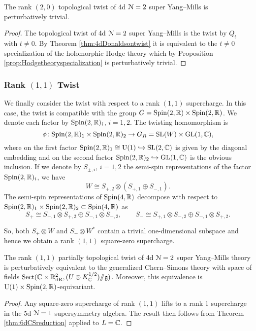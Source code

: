 \documentclass[10pt, oneside]{article}
\begin{document}
\begin{corollary}
The rank $(2,0)$ topological twist of 4d $\mathcal N=2$ super Yang--Mills is perturbatively trivial.
\label{cor:4dDonaldsontwist}
\end{corollary}
\begin{proof}
The topological twist of 4d $\mathcal N=2$ super Yang--Mills is the twist by $Q_t$ with $t\neq 0$. By Theorem \ref{thm:4dDonaldsontwist} it is equivalent to the $t\neq 0$ specialization of the holomorphic Hodge theory which by Proposition \ref{prop:Hodgetheoryspecialization} is perturbatively trivial.
\end{proof}

\subsubsection{Rank \texorpdfstring{$(1,1)$}{(1,1)} Twist}
\label{sect:4d_2_11}

We finally consider the twist with respect to a rank $(1,1)$ supercharge.
In this case, the twist is compatible with the group $G = \mathrm{Spin}(2, \mathbb R) \times \mathrm{Spin}(2, \mathbb R)$. 
We denote each factor by $\mathrm{Spin}(2, \mathbb R)_i$, $i=1,2$.  
The twisting homomorphism is
\[
\phi \colon \mathrm{Spin}(2, \mathbb R)_1 \times \mathrm{Spin}(2, \mathbb R)_2 \to G_R=\mathrm{SL}(W)\times \mathrm{GL}(1, \mathbb C),
\]
where on the first factor $\mathrm{Spin}(2, \mathbb R)_1 \cong \mathrm{U}(1)\hookrightarrow \mathrm{SL}(2, \mathbb C)$ is given by the diagonal embedding and on the second factor $\mathrm{Spin}(2, \mathbb R)_2 \hookrightarrow \mathrm{GL}(1, \mathbb C)$ is the obvious inclusion. 
If we denote by $S_{\pm, i}$, $i=1,2$ the semi-spin representations of the factor $\mathrm{Spin}(2, \mathbb R)_i$, we have
\[W \cong S_{+,2}\otimes (S_{+,1}\oplus S_{-,1}).\]
The semi-spin representations of $\mathrm{Spin}(4, \mathbb R)$ decompose with respect to $\mathrm{Spin}(2, \mathbb R)_1 \times \mathrm{Spin}(2, \mathbb R)_2\subset \mathrm{Spin}(4, \mathbb R)$ as
\[S_+\cong S_{+,1} \otimes S_{+,2} \oplus S_{-,1} \otimes S_{-,2},\qquad S_-\cong S_{+,1} \otimes S_{-,2} \oplus S_{-,1} \otimes S_{+,2}.\]

So, both $S_+\otimes W$ and $S_-\otimes W^*$ contain a trivial one-dimensional subspace and hence we obtain a rank $(1, 1)$ square-zero supercharge.

\begin{theorem} \label{thm:4d_11_twist}
The rank $(1,1)$ partially topological twist of 4d $\mathcal{N}=2$ super Yang--Mills theory is perturbatively equivalent to the generalized Chern--Simons theory with space of fields $\mathrm{Sect}(\mathbb C \times \mathbb R^2_{\mathrm{dR}}, (U \otimes K_\mathbb C^{1/2}) /\!\!/ \mathfrak{g})$.  
Moreover, this equivalence is $\mathrm{U}(1) \times \mathrm{Spin}(2, \mathbb R)$-equivariant.
\end{theorem}
\begin{proof}
Any square-zero supercharge of rank $(1, 1)$ lifts to a rank $1$ supercharge in the 5d $\mathcal N=1$ supersymmetry algebra.
The result then follows from Theorem \ref{thm:6dCSreduction} applied to $L = \mathbb C$. 
\end{proof}
\end{document}
